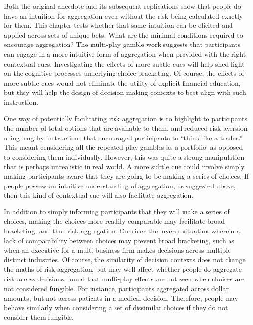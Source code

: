 \documentclass[a4paper, nobind]{templates/ociamthesis}
\theoremstyle{definition}
\theoremstyle{definition}
\theoremstyle{definition}
\theoremstyle{definition}
\theoremstyle{remark}
\begin{document}
Both the original \textcite{samuelson1963} anecdote and its subsequent replications show
that people do have an intuition for aggregation even without the risk being
calculated exactly for them. This chapter tests whether that same intuition can
be elicited and applied across sets of unique bets. What are the minimal
conditions required to encourage aggregation? The multi-play gamble work
suggests that participants can engage in a more intuitive form of aggregation
when provided with the right contextual cues. Investigating the effects of more
subtle cues will help shed light on the cognitive processes underlying choice
bracketing. Of course, the effects of more subtle cues would not eliminate the
utility of explicit financial education, but they will help the design of
decision-making contexts to best align with such instruction.

One way of potentially facilitating risk aggregation is to highlight to
participants the number of total options that are available to them.
\textcite{sokolhessner2009} and \textcite{sokolhessner2012} reduced risk aversion using lengthy
instructions that encouraged participants to ``think like a trader.'' This meant
considering all the repeated-play gambles as a portfolio, as opposed to
considering them individually. However, this was quite a strong manipulation
that is perhaps unrealistic in real world. A more subtle cue could involve
simply making participants aware that they are going to be making a series of
choices. If people possess an intuitive understanding of aggregation, as
suggested above, then this kind of contextual cue will also facilitate
aggregation.

In addition to simply informing participants that they will make a series of
choices, making the choices more readily comparable may facilitate broad
bracketing, and thus risk aggregation. Consider the inverse situation wherein a
lack of comparability between choices may prevent broad bracketing, such as when
an executive for a multi-business firm makes decisions across multiple distinct
industries. Of course, the similarity of decision contexts does not change the
maths of risk aggregation, but may well affect whether people do aggregate risk
across decisions. \textcite{dekay2005} found that multi-play effects are not seen when
choices are not considered fungible. For instance, participants aggregated
across dollar amounts, but not across patients in a medical decision. Therefore,
people may behave similarly when considering a set of dissimilar choices if they
do not consider them fungible.
\end{document}
